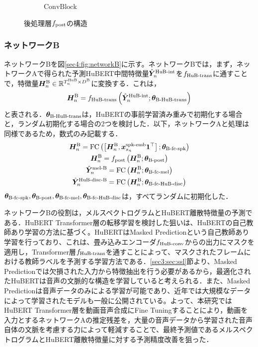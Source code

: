 \begin{figure}[tb]
\begin{subfigure}[b]{0.32\textwidth}
        \caption{$\text{ConvBlock}$}
        \label{sec4:fig:post_convblock}
    \end{subfigure}
    \caption{後処理層$f_{\text{post}}$の構造}
    \label{sec4:fig:post_three_step}
\end{figure}

\subsubsection{ネットワークB}
ネットワークBを図\ref{sec4:fig:networkB}に示す。ネットワークBでは，まず，ネットワークAで得られた予測HuBERT中間特徴量$\hat{\bm{Y}}^{\text{HuB-int}}_{n}$を$f_{\text{HuB-trans}}$に通すことで，特徴量$\bm{H}^{\text{B}}_{n} \in \mathbb{R}^{T^{\text{HuB}}_{n} \times D^{\text{B}}}$に変換する．これは，
\begin{equation}
    \bm{H}^{\text{B}}_{n} = f_{\text{HuB-trans}}\left(\hat{\bm{Y}}^{\text{HuB-int}}_{n}; \bm{\theta}_{\text{B-HuB-trans}}\right)
\end{equation}
と表される．$\bm{\theta}_{\text{B-HuB-trans}}$は，HuBERTの事前学習済み重みで初期化する場合と，ランダム初期化する場合の2つを検討した．以下，ネットワークAと処理は同様であるため，数式のみ記載する．
\begin{gather}
    \bm{H}^{\text{B}}_{n} = \text{FC}\left(\left[\bm{H}^{\text{B}}_{n}, \bm{x}^{\text{spk-emb}}_{s_{n}} \bm{1}^{\top}\right]; \bm{\theta}_{\text{B-fc-spk}}\right) \\
    \bm{H}^{\text{B}}_{n} = f_{\text{post}}\left(\bm{H}^{\text{B}}_{n}; \bm{\theta}_{\text{B-post}}\right) \\
    \hat{\bm{Y}}^{\text{mel-B}}_{n} = \text{FC}\left(\bm{H}^{\text{B}}_{n}; \bm{\theta}_{\text{B-fc-mel}}\right) \\
    \hat{\bm{Y}}^{\text{HuB-disc-B}}_{n} = \text{FC}\left(\bm{H}^{\text{B}}_{n}; \bm{\theta}_{\text{B-fc-HuB-disc}}\right)
\end{gather}
$\bm{\theta}_{\text{B-fc-spk}}, \bm{\theta}_{\text{B-post}}, \bm{\theta}_{\text{B-fc-mel}}, \bm{\theta}_{\text{B-fc-HuB-disc}}$は，すべてランダムに初期化した．

ネットワークBの役割は，メルスペクトログラムとHuBERT離散特徴量の予測である．HuBERT Transformer層の転移学習を検討した狙いは、HuBERTの自己教師あり学習の方法に基づく。HuBERTはMasked Predictionという自己教師あり学習を行っており、これは、畳み込みエンコーダ$f_{\text{HuB-conv}}$からの出力にマスクを適用し，Transformer層$f_{\text{HuB-trans}}$を通すことによって、マスクされたフレームにおける教師ラベルを予測する学習方法である．\ref{sec3:sec:ssl}節より、Masked Predictionでは欠損された入力から特徴抽出を行う必要があるから，最適化されたHuBERTは音声の文脈的な構造を学習していると考えられる．また、Masked Predictionは音声データのみによる学習が可能であり、近年では大規模なデータによって学習されたモデルも一般に公開されている。よって、本研究ではHuBERT Transformer層を動画音声合成にFine Tuningすることにより，動画を入力とするネットワークAの推定残差を，大量の音声データから学習された音声自体の文脈を考慮する力によって軽減することで、最終予測値であるメルスペクトログラムとHuBERT離散特徴量に対する予測精度改善を狙った．

